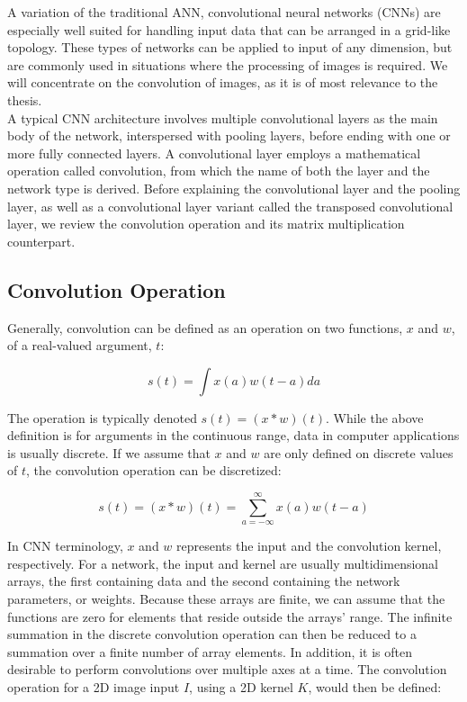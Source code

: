 A variation of the traditional ANN, convolutional neural networks (CNNs) are especially well suited for handling input data that can be arranged in a grid-like topology. These types of networks can be applied to input of any dimension, but are commonly used in situations where the processing of images is required. We will concentrate on the convolution of images, as it is of most relevance to the thesis. \\

\noindent A typical CNN architecture involves multiple convolutional layers as the main body of the network, interspersed with pooling layers, before ending with one or more fully connected layers. A convolutional layer employs a mathematical operation called convolution, from which the name of both the layer and the network type is derived. Before explaining the convolutional layer and the pooling layer, as well as a convolutional layer variant called the transposed convolutional layer, we review the convolution operation and its matrix multiplication counterpart.

\subsection{Convolution Operation}

Generally, convolution can be defined as an operation on two functions, $x$ and $w$, of a real-valued argument, $t$:

\begin{equation}
s(t) = \int x(a)w(t-a) da    
\end{equation}

\noindent The operation is typically denoted $s(t) = (x*w)(t)$. While the above definition is for arguments in the continuous range, data in computer applications is usually discrete. If we assume that $x$ and $w$ are only defined on discrete values of $t$, the convolution operation can be discretized:

\begin{equation}
s(t) = (x*w)(t) = \sum_{a=-\infty}^{\infty} x(a)w(t-a)
\end{equation}

\noindent In CNN terminology, $x$ and $w$ represents the input and the convolution kernel, respectively. For a network, the input and kernel are usually multidimensional arrays, the first containing data and the second containing the network parameters, or weights. Because these arrays are finite, we can assume that the functions are zero for elements that reside outside the arrays' range. The infinite summation in the discrete convolution operation can then be reduced to a summation over a finite number of array elements. In addition, it is often desirable to perform convolutions over multiple axes at a time. The convolution operation for a 2D image input $I$, using a 2D kernel $K$, would then be defined:


